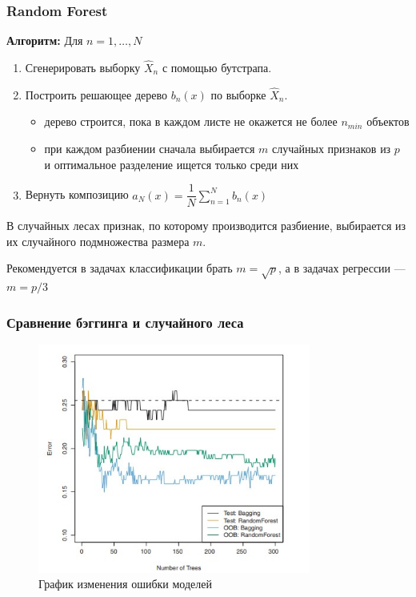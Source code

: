 \documentclass[fleqn,pdf, 9pt, usenames, dvipsnames, unicode, hyperref={bookmarks=true,bookmarksopen=false, bookmarksnumbered}]{beamer}
\begin{document}
\begin{frame}\frametitle{Random Forest}

\textbf{Алгоритм:}
Для $n=1,\ldots,N$
\begin{enumerate}
	\item Сгенерировать выборку $\hat{X}_n$ с помощью бутстрапа.
	\item Построить решающее дерево $b_n(x)$ по выборке $\hat{X}_n$.
	\begin{itemize}
		\item дерево строится, пока в каждом листе не окажется не более $n_{min}$ объектов
		\item при каждом разбиении сначала выбирается $m$ случайных признаков из $p$ и оптимальное разделение ищется только среди них
	\end{itemize}
	\item Вернуть композицию $a_N(x) = \dfrac{1}{N}\sum_{n=1}^{N}b_n(x)$
\end{enumerate}

В случайных лесах признак, по которому производится разбиение, выбирается из их случайного подмножества размера $m$.

Рекомендуется в задачах классификации брать $m=\sqrt{p}$, а в задачах регрессии --- $m=p/3$

\end{frame}

\begin{frame}\frametitle{Сравнение бэггинга и случайного леса}

\begin{figure}[!ht]
	\centering
	\includegraphics[width=0.8\textwidth]{bag_rf.jpg}
	\caption{График изменения ошибки моделей}
	\label{fig:bias_var}
\end{figure}

\end{frame}
\end{document}
